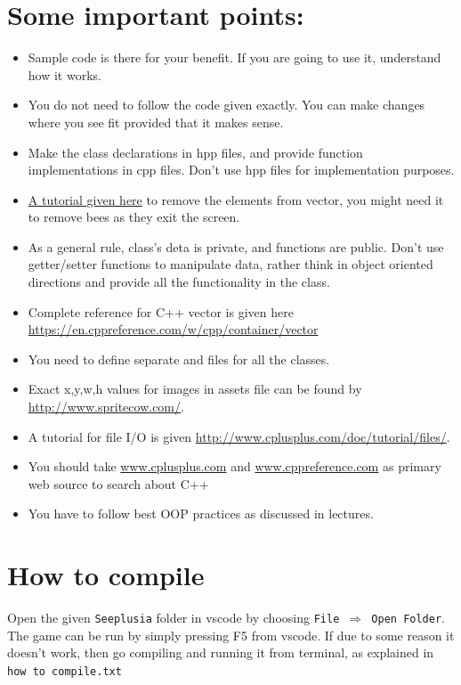 \documentclass[a4paper,12pt]{article}
\begin{document}
\section{Some important points:} 

\begin{itemize}
	\item Sample code is there for your benefit. If you are going to use it, understand how it works. 
	\item You do not need to follow the code given exactly. You can make changes where you see fit provided that it makes sense.
	\item Make the class declarations in hpp files, and provide function implementations in cpp files. Don't use hpp files for implementation purposes.
	\item \href{https://www.techiedelight.com/remove-elements-vector-inside-loop-cpp/}{A tutorial given here} to remove the elements from vector, you might need it to remove bees as they exit the screen.
	\item As a general rule, class's deta is private, and functions are public. Don't use getter/setter functions to manipulate data, rather think in object oriented directions and provide all the functionality in the class.
	\item Complete reference for C++ vector is given here \url{https://en.cppreference.com/w/cpp/container/vector}
	\item You need to define separate  and  files for all the classes.
	\item Exact x,y,w,h values for images in assets file can be found by \url{http://www.spritecow.com/}. 
	\item A tutorial for file I/O is given \url{http://www.cplusplus.com/doc/tutorial/files/}. 
	\item You should take \url{www.cplusplus.com} and \url{www.cppreference.com} as primary web source to search about C++
	\item You have to follow best OOP practices as discussed in lectures.
\end{itemize}

\section{How to compile}
Open the given \texttt{Seeplusia} folder in vscode by choosing \texttt{File $\Rightarrow$ Open Folder}. The game can be run by simply pressing F5 from vscode. If due to some reason it doesn't work, then go compiling and running it from terminal, as explained in \texttt{how to compile.txt}
\end{document}
